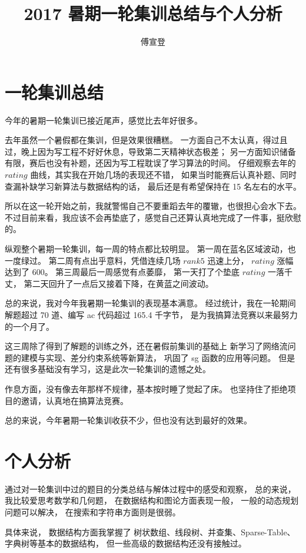 \documentclass[UTF8]{ctexart}
\title{2017 暑期一轮集训总结与个人分析}
\author{傅宣登}
\begin{document}
\maketitle

\section{一轮集训总结}

今年的暑期一轮集训已接近尾声，感觉比去年好很多。

去年虽然一个暑假都在集训，但是效果很糟糕。
一方面自己不太认真，得过且过，晚上因为写工程不好好休息，导致第二天精神状态极差；
另一方面知识储备有限，赛后也没有补题，还因为写工程耽误了学习算法的时间。
仔细观察去年的 $rating$ 曲线，其实我在开始几场的表现还不错，
如果当时能赛后认真补题、同时查漏补缺学习新算法与数据结构的话，
最后还是有希望保持在 15 名左右的水平。

所以在这一轮开始之前，我就警惕自己不要重蹈去年的覆辙，也很担心会水下去。
不过目前来看，我应该不会再垫底了，感觉自己还算认真地完成了一件事，挺欣慰的。

纵观整个暑期一轮集训，每一周的特点都比较明显。
第一周在蓝名区域波动，也一度绿过。
第二周有点出乎意料，凭借连续几场 $rank 5$ 迅速上分，
$rating$ 涨幅达到了 600。
第三周最后一周感觉有点萎靡，
第一天打了个垫底 $rating$ 一落千丈，
第二天回升了一点后又接着下降，在黄蓝之间波动。

总的来说，我对今年我暑期一轮集训的表现基本满意。
经过统计，我在一轮期间解题超过 70 道、编写 ac 代码超过 165.4 千字节，
是为我搞算法竞赛以来最努力的一个月了。

这三周除了得到了解题的训练之外，还在暑假前集训的基础上
新学习了网络流问题的建模与实现、差分约束系统等新算法，
巩固了 sg 函数的应用等问题。
但是还有很多基础没有学习，这是此次一轮集训的遗憾之处。

作息方面，没有像去年那样不规律，基本按时睡了觉起了床。
也坚持住了拒绝项目的邀请，认真地在搞算法竞赛。

总的来说，今年暑期一轮集训收获不少，但也没有达到最好的效果。

\section{个人分析}

通过对一轮集训中过的题目的分类总结与解体过程中的感受和观察，
总的来说，我比较爱思考数学和几何题，
在数据结构和图论方面表现一般，
一般的动态规划问题可以解决，
在搜索和字符串方面则是很弱。

具体来说，
数据结构方面我掌握了
树状数组、线段树、并查集、Sparse-Table、字典树等基本的数据结构，
但一些高级的数据结构还没有接触过。
\end{document}
